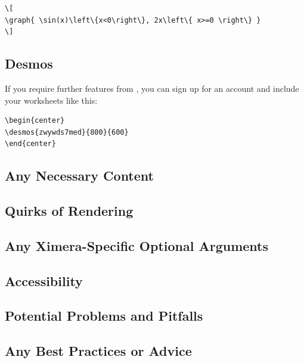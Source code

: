 \documentclass{ximera}
\begin{document}
\begin{verbatim}
\[
\graph{ \sin(x)\left\{x<0\right\}, 2x\left\{ x>=0 \right\} }
\]
\end{verbatim}


\subsection{Desmos}

If you require further features from
, you can sign up for an account
and include your worksheets like this:

\begin{verbatim}
\begin{center}
\desmos{zwywds7med}{800}{600}
\end{center}
\end{verbatim}
\begin{center}
\end{center}



    \subsection*{Any Necessary Content}
    
    
    
    \subsection*{Quirks of Rendering}
    
    
    
    \subsection*{Any Ximera-Specific Optional Arguments}
    
    
    
    \subsection*{Accessibility}
    
    
    
    \subsection*{Potential Problems and Pitfalls}
    
    
    
    \subsection*{Any Best Practices or Advice}
    
    

    
\end{document}
